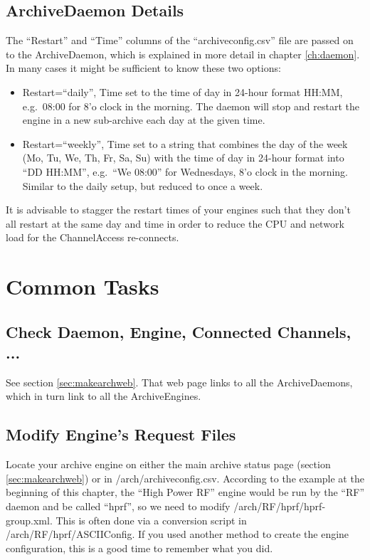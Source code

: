 \subsection{ArchiveDaemon Details}
The ``Restart'' and ``Time'' columns of the ``archiveconfig.csv'' file
are passed on to the ArchiveDaemon, which is explained in more detail
in chapter \ref{ch:daemon}. In many cases it might be sufficient to
know these two options:
\begin{itemize}
\item Restart=``daily'', Time set to the time of day in 24-hour
      format HH:MM, e.g.\ 08:00 for 8'o clock in the morning.
      The daemon will stop and restart the engine in a new sub-archive
      each day at the given time.
\item Restart=``weekly'', Time set to a string that combines the day
      of the week (Mo, Tu,  We, Th, Fr, Sa, Su) with the time of day in 24-hour
      format into ``DD HH:MM'', e.g.\ ``We 08:00'' for Wednesdays, 8'o
      clock in the morning. Similar to the daily setup, but reduced to
      once a week.
\end{itemize}
\noindent It is advisable to stagger the restart times of your engines
such that they don't all restart at the same day and time in order to
reduce the CPU and network load for the ChannelAccess re-connects.

\section{Common Tasks}

\subsection{Check Daemon, Engine, Connected Channels, ...}
See section \ref{sec:makearchweb}. That web page links to all
the ArchiveDaemons, which in turn link to all the ArchiveEngines.

\subsection{Modify Engine's Request Files}
Locate your archive engine on either the main archive status page
(section  \ref{sec:makearchweb}) or in /arch/archiveconfig.csv.
According to the example at the beginning of this chapter, the ``High
Power RF'' engine would be run by the ``RF'' daemon and be called
``hprf'', so we need to modify /arch/RF/hprf/hprf-group.xml.
This is often done via a conversion script in
/arch/RF/hprf/ASCIIConfig. If you used another method to create the
engine configuration, this is a good time to remember what you did.

